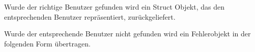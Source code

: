 \lstset{language=XML}


Wurde der richtige Benutzer gefunden wird ein Struct Objekt, das den
entsprechenden Benutzer repräsentiert, zurückgeliefert.



Wurde der entsprechende Benutzer nicht gefunden wird ein Fehlerobjekt in der
folgenden Form übertragen.


